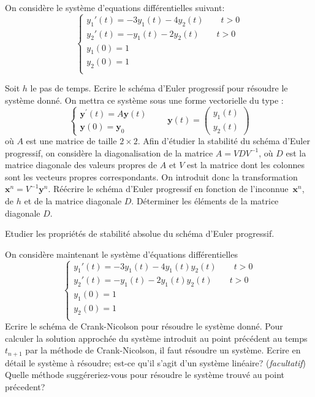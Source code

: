 \documentclass[11pt]{article}
\begin{document}
\begin{Exercise}[label={ex:1}]

On consid\`ere le syst\`eme d'equations diff\'erentielles suivant:
\[
  \left\{
  \begin{array}{l}
  y_1'(t) = - 3 y_1(t) - 4y_2(t) \qquad t>0\\
  y_2'(t) = - y_1(t) - 2 y_2(t) \qquad t>0\\
  y_1(0) = 1\\
  y_2(0) = 1\\
  \end{array}
  \right.
\]

\Question
Soit $h$ le pas de temps. Ecrire le sch\'ema d'Euler progressif
pour r\'esoudre le syst\`eme donn\'e. On mettra ce syst\`eme sous
une forme vectorielle du type :
\begin{equation*}
\begin{cases}
      \mathbf{y}^\prime(t)=A\mathbf{y}(t)\\
      \mathbf{y}(0) = \mathbf{y}_0
\end{cases} \qquad
\mathbf{y}(t) = \begin{pmatrix} y_1(t)\\y_2(t) \end{pmatrix}
\end{equation*}
o\`u $A$ est une matrice de taille $2 \times 2$.  \Question Afin
d'\'etudier la stabilit\'e du sch\'ema d'Euler progressif, on
consid\`ere la diagonalisation de la matrice $A=VDV^{-1}$, o\`u $D$
est la matrice diagonale des valeurs propres de $A$ et $V$ est la
matrice dont les colonnes sont les vecteurs propres correspondants. On
introduit donc la transformation $\mathbf{x}^n=V^{-1}\mathbf{y}^n$.
\subQuestion R\'e\'ecrire le sch\'ema d'Euler progressif en fonction de
l'inconnue~$\mathbf{x}^n$, de $h$ et de la matrice diagonale $D$.
\subQuestion D\'eterminer les \'el\'ements de la matrice diagonale $D$.

\Question Etudier
les propri\'et\'es de stabilit\'e absolue du sch\'ema d'Euler
progressif.

\Question
On consid\`ere maintenant le syst\`eme d'\'equations
diff\'erentielles
\[
  \left\{
  \begin{array}{l}
  y_1'(t) = - 3 y_1(t) - 4y_1(t)y_2(t) \qquad t>0\\
  y_2'(t) = - y_1(t) - 2 y_1(t)y_2(t) \qquad t>0\\
  y_1(0) = 1\\
  y_2(0) = 1\\
  \end{array}
  \right.
\]
Ecrire le sch\'ema de Crank-Nicolson pour r\'esoudre le syst\`eme
donn\'e.
\Question
Pour calculer la solution approch\'ee du syst\`eme introduit au
point précédent au temps $t_{n+1}$ par la m\'ethode de Crank-Nicolson, il
faut r\'esoudre un syst\`eme. Ecrire en d\'etail le syst\`eme \`a
r\'esoudre; est-ce qu'il s'agit d'un syst\`eme lin\'eaire?
\Question (\emph{facultatif})
Quelle m\'ethode suggéreriez-vous pour r\'esoudre le syst\`eme
trouv\'e au point pr\'ecedent?
\end{Exercise}
\end{document}
